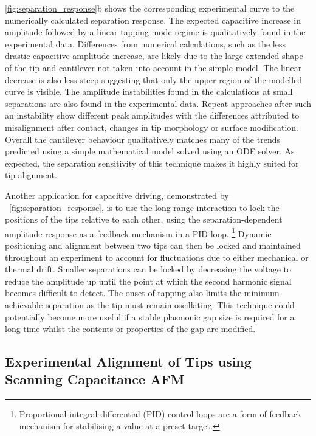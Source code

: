 \documentclass{article}
\begin{document}
\autoref{fig:separation_response}b shows the corresponding experimental curve to the numerically calculated separation response. The expected capacitive increase in amplitude followed by a linear tapping mode regime is qualitatively found in the experimental data. Differences from numerical calculations, such as the less drastic capacitive amplitude increase, are likely due to the large extended shape of the tip and cantilever not taken into account in the simple model. The linear decrease is also less steep suggesting that only the upper region of the modelled curve is visible. The amplitude instabilities found in the calculations at small separations are also found in the experimental data. Repeat approaches after such an instability show different peak amplitudes with the differences attributed to misalignment after contact, changes in tip morphology or surface modification. Overall the cantilever behaviour qualitatively matches many of the trends predicted using a simple mathematical model solved using an ODE solver. As expected, the separation sensitivity of this technique makes it highly suited for tip alignment.

Another application for capacitive driving, demonstrated by \figurename~\ref{fig:separation_response}, is to use the long range interaction to lock the positions of the tips relative to each other, using the separation-dependent amplitude response as a feedback mechanism in a PID loop.%
\footnote{Proportional-integral-differential (PID) control loops are a form of feedback mechanism for stabilising a value at a preset target.}
Dynamic positioning and alignment between two tips can then be locked and maintained throughout an experiment to account for fluctuations due to either mechanical or thermal drift. Smaller separations can be locked by decreasing the voltage to reduce the amplitude up until the point at which the second harmonic signal becomes difficult to detect. The onset of tapping also limits the minimum achievable separation as the tip must remain oscillating. This technique could potentially become more useful if a stable plasmonic gap size is required for a long time whilst the contents or properties of the gap are modified.

\FloatBarrier
\subsection{Experimental Alignment of Tips using Scanning Capacitance AFM}
\end{document}

